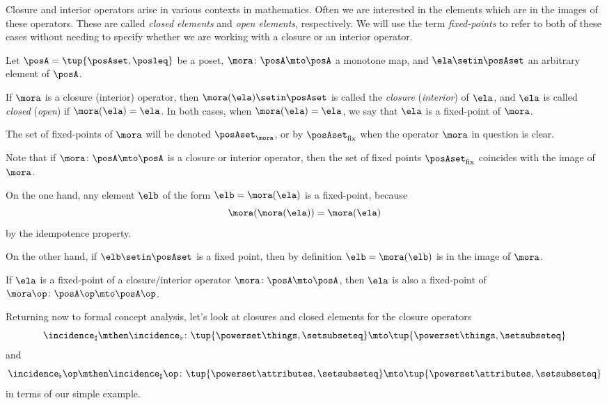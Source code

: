 Closure and interior operators arise in various contexts in mathematics.
Often we are interested in the elements which are in the images of these operators.
These are called \emph{closed elements} and \emph{open elements}, respectively.
We will use the term \emph{fixed-points} to refer to both of these cases without needing to specify whether we are working with a closure or an interior operator.

\begin{definition}\label{def:closure-closed-elements}
    Let $\posA = \tup{\posAset, \posleq}$ be a poset, $\mora \colon \posA \mto \posA$ a monotone map, and $\ela \setin \posAset$ an arbitrary element of $\posA$.

    If $\mora$ is a closure (interior) operator, then $\mora(\ela) \setin \posAset$ is called the \emph{closure} (\emph{interior}) of $\ela$, and $\ela$ is called \emph{closed} (\emph{open}) if $\mora(\ela) = \ela$.
    In both cases, when $\mora(\ela) = \ela$, we say that $\ela$ is a fixed-point of $\mora$.

    The set of fixed-points of $\mora$ will be denoted $\posAset_\mora$, or by $\posAset_{\text{fix}}$ when the operator $\mora$ in question is clear.
\end{definition}

\begin{remark}\label{rem:closed-elements-are-image}
    Note that if $\mora \colon \posA \mto \posA$ is a closure or interior operator, then the set of fixed points $\posAset_{\text{fix}}$ coincides with the image of $\mora$.

    On the one hand, any element $\elb$ of the form $\elb = \mora(\ela)$ is a fixed-point, because
    \begin{equation}
        \mora(\mora(\ela)) = \mora(\ela)
    \end{equation}
    by the idempotence property.

    On the other hand, if $\elb \setin \posAset$ is a fixed point, then by definition $\elb = \mora(\elb)$ is in the image of $\mora$.
\end{remark}

\begin{remark}\label{rem:fixed-points-coincide-closure-or-interior}
    If $\ela$ is a fixed-point of a closure/interior operator $\mora \colon \posA \mto \posA$, then $\ela$ is also a fixed-point of $\mora\op \colon \posA\op \mto \posA\op$.
\end{remark}

Returning now to formal concept analysis, let's look at closures and closed elements for the closure operators
$$\incidence_\sharp \mthen \incidence_\flat \colon \tup{\powerset \things, \setsubseteq} \mto \tup{\powerset \things, \setsubseteq}$$
and
$$\incidence_\flat\op \mthen \incidence_\sharp\op \colon \tup{\powerset \attributes, \setsubseteq} \mto \tup{\powerset \attributes, \setsubseteq} $$
in terms of our simple example.

